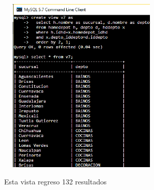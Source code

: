 \documentclass[12pt, titlepage]{article}
\begin{document}
	\begin{figure}[H]
		\begin{center}
			\includegraphics[width=8cm, height=8.5cm]{img/v7.png}
			\label{fig:v7}
			\caption{Esta vista regreso 132 resultados}
		\end{center}
	\end{figure}
	
\end{document}
